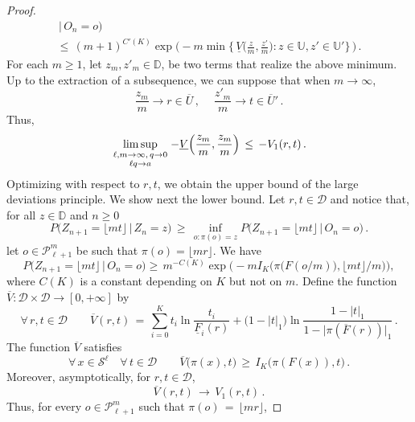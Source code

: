 \documentclass[a4paper,12pt]{article}
\theoremstyle{definition}
\theoremstyle{remark}
\def \cB {\mathcal{B}}
\def \cD {\mathcal{D}}
\def \cP {\mathcal{P}}
\def \cS {\mathcal{S}}
\def \b {\beta}
\def \t {\theta}
\def \dD {\mathbb{D}}
\def \R {\mathbb{R}}
\def \dU {\mathbb{U}}
\def \lra {\longrightarrow}
\def \pml {\cP^m_{\ell +1}}
\begin{document}
\begin{proof}
\begin{multline*}
\,|\, O_n=o\big)
\\\leq\,
(m+1)^{C'(K)}\exp\bigg(
-m\min\bigg\lbrace\,
\underline{V}\Big(
\frac{z}{m},\frac{z'}{m}
\Big):z\in \dU,z'\in \dU'
\bigg\rbrace\,
\bigg)\,.
\end{multline*}
For each
$m\geq 1$,
let
$z_m,z'_m\in\dD$,
be two terms that realize the above minimum.
Up to the extraction of a subsequence,
we can suppose that when
$m\to\infty$,
$$\frac{z_m}{m}\to r\in\overline{U}\,,\ \quad
\frac{z'_m}{m}\to t\in\overline{U}'\,.$$
Thus,
$$
\limsup_{\genfrac{}{}{0pt}{1}{\ell,m\to\infty,\,q\to 0}{{\ell q} \to a}} 
-\underline{V}\Big(
\frac{z_m}{m},
\frac{z_m}{m}
\Big)
\,\leq\,
-V_1(r,t)\,.
$$
Optimizing with respect to $r,t$,
we obtain the upper bound of the large deviations principle.
We show next the lower bound.
Let
$r,t\in\cD$
and
notice that,
for all $z\in\dD$ and $n\geq 0$
$$
P\big(
Z_{n+1}=\lfloor mt\rfloor\,\big|\, Z_n=z
\big)\,\geq\,
\inf_{o:\pi(o)=z}P\big(
Z_{n+1}=\lfloor mt\rfloor\,\big|\,O_n=o
\big)\,.
$$
let $o\in\pml$ be such that $\pi(o)=\lfloor m r\rfloor$. 
We have
$$
P\big(
Z_{n+1}=\lfloor mt\rfloor\,\big|\,
O_n=o
\big)
\geq\, m^{-C(K)}\exp\bigg(
-mI_K\Big(
\pi\big(
F(o/m)
\big),\lfloor mt \rfloor/m
\Big)
\bigg),
$$
where $C(K)$ is a constant depending on $K$ but not on $m$.
Define the function $\overline{V}:\cD\times\cD\lra[0,+\infty]$
by
$$
\forall\, r,t\in\cD\qquad
\overline{V}(r,t)\,=\,\sum_{i=0}^K t_i\ln\frac{t_i}{\underline{F}_i(r)}
+\big(
1-|t|_1\big)
\ln\frac{1-|t|_1}{1-\big|
\pi(\overline{F}(r))
\big|_1}\,.$$
The function $\overline{V}$ satisfies
$$\forall\, x\in\cS^{\ell}\quad \forall\, t\in\cD\qquad
\overline{V}\big(
\pi(x),t
\big)\,\geq\,I_K\big(
\pi(F(x)),t
\big)\,.$$
Moreover, asymptotically, for $r,t\in\cD$,
$$\overline{V}(r,t)\,\lra\,V_1(r,t)\,.$$
Thus, for every $o\in\pml$ such that $\pi(o)\,=\,\lfloor mr\rfloor$,

\end{proof}
\end{document}
